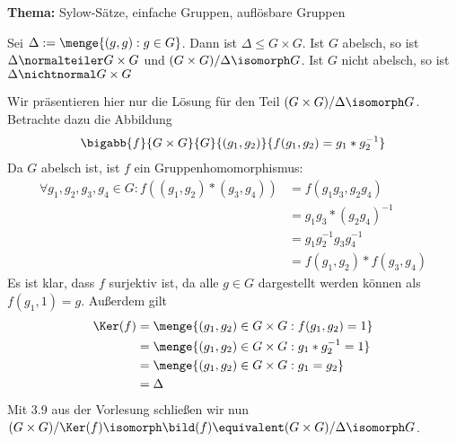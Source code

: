 \begin{uebungsblatt}
	\textbf{Thema:} Sylow-Sätze, einfache Gruppen, auflösbare Gruppen
	\vspace{0.5cm}
	\setcounter{taskcount}{65}
	\begin{uebung} [Vorbereitung]
		Sei $\Delta := \menge{(g,g) : g \in G}$. Dann ist $\Delta \leq G \times G$. Ist $G$ abelsch, so ist $\Delta \normalteiler G \times G$ und $(G \times G)/\Delta \isomorph G$. Ist $G$ nicht abelsch, so ist $\Delta \nichtnormal G \times G$
	\end{uebung}
	\begin{loesung}
		Wir präsentieren hier nur die Lösung für den Teil $(G \times G)/\Delta \isomorph G$. Betrachte dazu die Abbildung
		\begin{align*}
			\bigabb{f}{G \times G}{G}{(g_1, g_2)}{f(g_1, g_2) = g_1 * g_2^{-1}}
		\end{align*}
		Da $G$ abelsch ist, ist $f$ ein Gruppenhomomorphismus:
		\begin{align*}
			\forall g_1, g_2, g_3, g_4 \in G : f((g_1, g_2) * (g_3, g_4)) 
			&= f(g_1 g_3, g_2 g_4) \\
			&= g_1 g_3 *\left( g_2 g_4 \right)^{-1} \\
			&= g_1 g_2^{-1} g_3 g_4^{-1} \\
			&= f(g_1, g_2) * f(g_3, g_4)
		\end{align*}
		Es ist klar, dass $f$ surjektiv ist, da alle $g \in G$ dargestellt werden können als $f(g_1, 1) = g$. Außerdem gilt
		\begin{align*}
			\Ker(f) &= \menge{(g_1, g_2) \in G \times G : f(g_1, g_2) = 1} \\
			&= \menge{(g_1, g_2) \in G \times G : g_1 * g_2^{-1} = 1} \\
			&= \menge{(g_1, g_2) \in G \times G : g_1 = g_2} \\
			&= \Delta
		\end{align*}
		Mit 3.9 aus der Vorlesung schließen wir nun $(G \times G) / \Ker(f) \isomorph \bild(f) \equivalent (G \times G) / \Delta \isomorph G$.
	\end{loesung}

	\setcounter{taskcount}{67}


\end{uebungsblatt}

